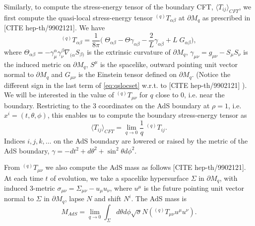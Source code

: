 \documentclass[a4paper,11pt]{article}
\numberwithin{equation}{section}
\begin{document}
Similarly, to compute the stress-energy tensor of the boundary CFT, $\langle T_{ij}\rangle_{CFT}$, we first compute the quasi-local stress-energy tensor $^{(q)}T_{\alpha\beta}$ at $\partial M_q$ as prescribed in  [CITE hep-th/9902121]. We have
\begin{equation}
\label{eq:qslocset}
^{(q)}T_{\alpha\beta}=\frac{1}{8\pi}\biggl(\;   \Theta_{\alpha\beta}-\Theta \gamma_{\alpha\beta}-\frac{2}{L}\gamma_{\alpha\beta}+L \;G_{\alpha\beta} \biggr),
\end{equation}
where $\Theta_{\alpha\beta}=-\gamma^\alpha_{\mu}\gamma^\beta_\nu\nabla_{(\alpha}S_{\beta)}$ is the extrinsic curvature of $\partial M_q$, $\gamma_{\mu\nu}=g_{\mu\nu}-S_\mu S_\nu$ is the induced metric on $\partial M_q$, $S^\mu$ is the spacelike, outward pointing unit vector normal to $\partial M_q$ and $G_{\mu\nu}$ is the Einstein tensor defined on $\partial M_q$. (Notice the different sign in the last term of \eqref{eq:qslocset} w.r.t. to  [CITE hep-th/9902121] ). We will be interested in the value of $^{(q)}T_{\mu\nu}$ for $q$ close to 0, i.e. near the boundary.
Restricting to the 3 coordinates on the AdS boundary at $\rho=1$, i.e. $x^i=(t,\theta,\phi)$, this enables us to compute the boundary stress-energy tensor as
\begin{equation}
\langle T_{ij}\rangle_{CFT}=\lim_{q\to0}\frac{1}{q}  \;^{(q)}T_{ij}.
\end{equation}
Indices $i,j,k,\dots$ on the AdS boundary are lowered or raised by the metric of the AdS boundary, $\gamma=-dt^2+d\theta^2+\sin^2\theta d\phi^2$.

From $^{(q)}T_{\mu\nu}$ we also compute the AdS mass as follows [CITE hep-th/9902121]. At each time $t$ of evolution, we take a spacelike hypersurface $\Sigma$ in $\partial M_q$, with induced 3-metric $\sigma_{\mu\nu}=\Sigma_{\mu\nu}-u_\mu u_\nu$, where $u^\mu$ is the future pointing unit vector normal to $\Sigma$ in $\partial M_q$, lapse $N$ and shift $N^i$. The AdS mass is
\begin{equation}
M_{AdS}=\lim_{q\to0}\int_\Sigma d\theta d\phi \sqrt{\sigma} N ( ^{(q)}T_{\mu\nu} u^\mu u^\nu).
\end{equation}
\end{document}
